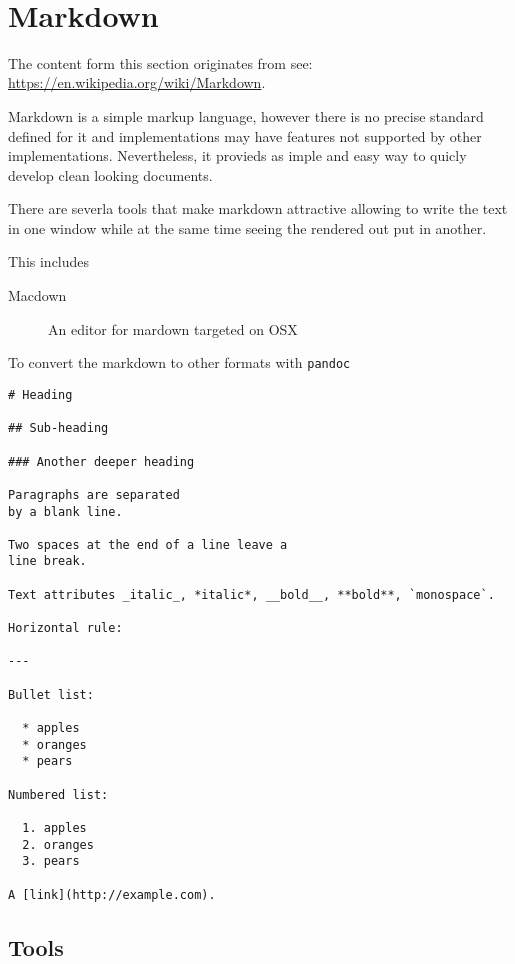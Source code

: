 \FILENAME\

\section{Markdown}\label{S:markdown}

The content form this section originates from see:
\url{https://en.wikipedia.org/wiki/Markdown}.

Markdown is a simple markup language, however there is no precise
standard defined for it and implementations may have features not
supported by other implementations. Nevertheless, it provieds as imple
and easy way to quicly develop clean looking documents.

There are severla tools that make markdown attractive allowing to
write the text in one window while at the same time seeing the
rendered out put in another.

This includes

\begin{description}

\item[Macdown] An editor for mardown targeted on OSX

\end{description}

To convert the markdown to other formats with \verb|pandoc|

\begin{verbatim}
# Heading

## Sub-heading

### Another deeper heading
 
Paragraphs are separated
by a blank line.

Two spaces at the end of a line leave a  
line break.

Text attributes _italic_, *italic*, __bold__, **bold**, `monospace`.

Horizontal rule:

---

Bullet list:

  * apples
  * oranges
  * pears

Numbered list:

  1. apples
  2. oranges
  3. pears

A [link](http://example.com).

\end{verbatim}

\subsection{Tools}

